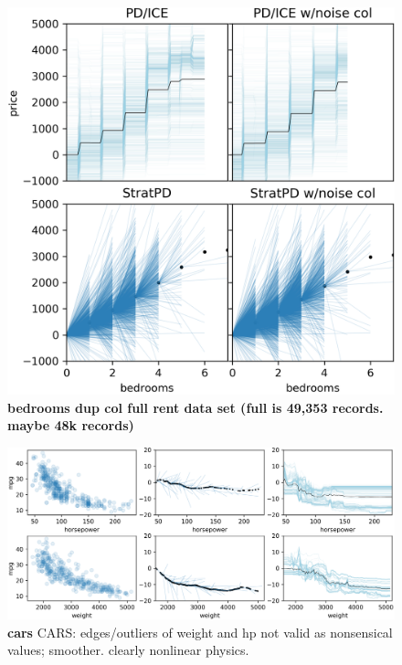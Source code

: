 \documentclass[12pt]{article}
\begin{document}
\begin{figure}[htbp]
\begin{center}
\includegraphics[scale=0.6]{images/bedrooms_vs_price_noise.png}
\caption{{\bf  bedrooms dup col full rent data set (full is 49,353 records. maybe 48k records)}}
\label{fig:beds_noise}
\end{center}
\end{figure}

\begin{figure}[htbp]
\begin{center}
\includegraphics[scale=0.7]{images/cars.png}
\caption{{\bf  cars} CARS: edges/outliers of weight and hp not valid as nonsensical values; smoother. clearly nonlinear physics.}
\label{fig:cars}
\end{center}
\end{figure}
\end{document}
